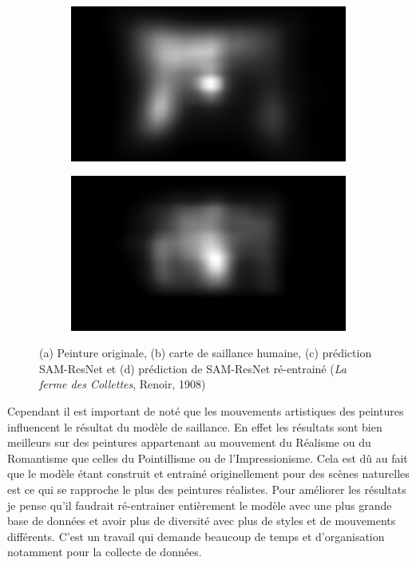 \begin{figure}[ht]
    \begin{subfigure}{.49\textwidth}
        \includegraphics[width=\linewidth]{datas/samresnet/orig_La_Ferme_des_Collettes_Renoir_1908.png}
        \caption{}
    \end{subfigure}
    \begin{subfigure}{.49\textwidth}
        \includegraphics[width=\linewidth]{datas/samresnet/retrain_La_Ferme_des_Collettes_Renoir_1908.png}
        \caption{}
    \end{subfigure}
    \caption{(a) Peinture originale, (b) carte de saillance humaine, (c) prédiction SAM-ResNet et (d) prédiction de SAM-ResNet ré-entrainé (\emph{La ferme des Collettes}, Renoir, 1908)}
    \label{fig:avantapres}
\end{figure}

\par
Cependant il est important de noté que les mouvements artistiques des peintures influencent le résultat du modèle de saillance. En effet les résultats sont bien meilleurs sur des peintures appartenant au mouvement du Réalisme ou du Romantisme que celles du Pointillisme ou de l'Impressionisme. Cela est dû au fait que le modèle étant construit et entrainé originellement pour des scènes naturelles est ce qui se rapproche le plus des peintures réalistes. Pour améliorer les résultats je pense qu'il faudrait ré-entrainer entièrement le modèle avec une plus grande base de données et avoir plus de diversité avec plus de styles et de mouvements différents. C'est un travail qui demande beaucoup de temps et d'organisation notamment pour la collecte de données.